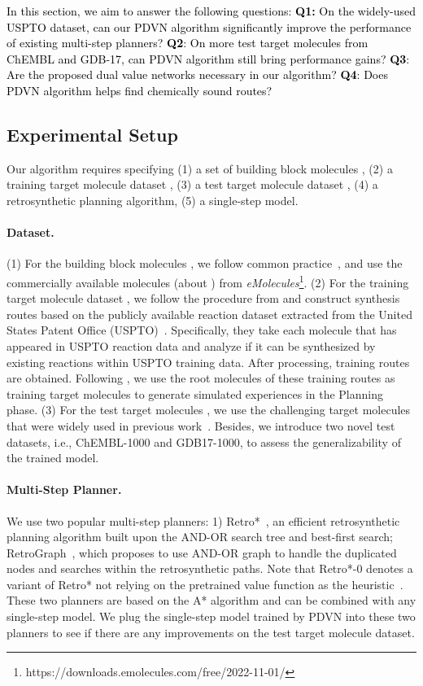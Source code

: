\documentclass[nohyperref]{article}
\theoremstyle{plain}
\theoremstyle{definition}
\theoremstyle{remark}
\begin{document}
\textcolor{black}{In this section, we aim to answer the following questions: \textbf{Q1:} On the widely-used USPTO dataset, can our PDVN algorithm significantly improve the performance of existing multi-step planners?
\textbf{Q2}: On more test target molecules from ChEMBL and GDB-17, can PDVN algorithm still bring performance gains?
\textbf{Q3}: Are the proposed dual value networks necessary in our algorithm? 
\textbf{Q4}: 
Does PDVN algorithm helps find chemically sound routes?
}
\subsection{Experimental Setup}
Our algorithm requires specifying (1) a set of building block molecules ,
(2) a training target molecule dataset ,
(3) a test target molecule dataset ,
(4) a retrosynthetic planning algorithm, 
(5) a single-step model.

\paragraph{Dataset.}
(1) For the building block molecules , we follow common practice~\cite{chen20retrostar}, and use the commercially available molecules (about ) from \textit{eMolecules}\footnote{https://downloads.emolecules.com/free/2022-11-01/}.
(2) For the training target molecule dataset , we follow the procedure from \cite{chen20retrostar, kim2021self} and construct synthesis routes based on the publicly available reaction dataset extracted from the United States Patent Office (USPTO)~\cite{lowe2012extraction}. 
Specifically, they take each molecule that has appeared in USPTO reaction data and analyze if it can be synthesized by existing reactions within USPTO training data. After processing,  training routes are obtained. 
Following \citep{kim2021self}, we use the root molecules of these training routes as training target molecules to generate simulated experiences in the Planning phase.
(3) For the test target molecules , we use the  challenging target molecules that were widely used in previous work~\cite{chen20retrostar, kim2021self, han2022gnn, xie2022retrograph, tripp2022reevaluating}.
Besides, we introduce two novel test datasets, i.e., ChEMBL-1000 and GDB17-1000, to assess the generalizability of the trained model.


\paragraph{Multi-Step Planner.} We use two popular multi-step planners: 1) Retro*~\cite{chen20retrostar}, an efficient retrosynthetic planning algorithm built upon the AND-OR search tree and best-first search;
RetroGraph~\cite{xie2022retrograph}, which proposes to use AND-OR graph to handle the duplicated nodes and searches within the retrosynthetic paths.
Note that Retro*-0 denotes a variant of Retro* not relying on the pretrained value function as the heuristic~\citep{chen20retrostar}. 
These two planners are based on the A* algorithm and can be combined with any single-step model. 
We plug the single-step model trained by PDVN into these two planners to see if there are any improvements on the test target molecule dataset. 
\end{document}
